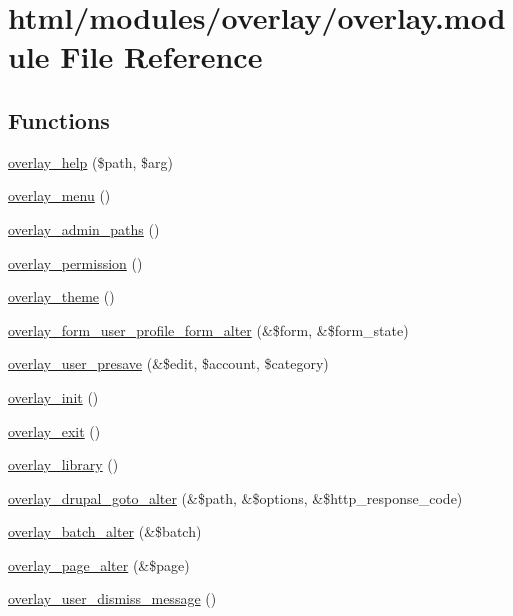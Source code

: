\hypertarget{overlay_8module}{
\section{html/modules/overlay/overlay.module File Reference}
\label{overlay_8module}
}
\subsection*{Functions}
\begin{DoxyCompactItemize}
\item 
\hyperlink{overlay_8module_a18127ec6257d994beff56b2fd30096f6}{overlay\_\-help} (\$path, \$arg)
\item 
\hyperlink{overlay_8module_aa3d9f958c957e818d7cbe42da37cbaf3}{overlay\_\-menu} ()
\item 
\hyperlink{overlay_8module_a1ccea18af9d51ab0f5549bbb95f3976c}{overlay\_\-admin\_\-paths} ()
\item 
\hyperlink{overlay_8module_a85176c474764d79629d986607de8d66e}{overlay\_\-permission} ()
\item 
\hyperlink{overlay_8module_affc885d56daf12cc33756c9ddeb5ff38}{overlay\_\-theme} ()
\item 
\hyperlink{overlay_8module_a42fa72cb204d2afbf03fe801842ea3ef}{overlay\_\-form\_\-user\_\-profile\_\-form\_\-alter} (\&\$form, \&\$form\_\-state)
\item 
\hyperlink{overlay_8module_adb8ac54c44a2606a1153ab15860fc343}{overlay\_\-user\_\-presave} (\&\$edit, \$account, \$category)
\item 
\hyperlink{overlay_8module_aa31ec5e73a1837996e5e33e8b814f1fd}{overlay\_\-init} ()
\item 
\hyperlink{overlay_8module_a6fb08436be20a7885c50eaa84a413f6c}{overlay\_\-exit} ()
\item 
\hyperlink{overlay_8module_ae047a291d9805cafb44b116162460984}{overlay\_\-library} ()
\item 
\hyperlink{overlay_8module_ad0368c6b16fb040fd8139e60e7b3b321}{overlay\_\-drupal\_\-goto\_\-alter} (\&\$path, \&\$options, \&\$http\_\-response\_\-code)
\item 
\hyperlink{overlay_8module_affb9e486f372808ca4d86fafc675ecb4}{overlay\_\-batch\_\-alter} (\&\$batch)
\item 
\hyperlink{overlay_8module_a6562f3cdc2016db35295e1c97a2de3f2}{overlay\_\-page\_\-alter} (\&\$page)
\item 
\hyperlink{overlay_8module_a82316c3dbea636c39a2cc05c630a0fa4}{overlay\_\-user\_\-dismiss\_\-message} ()

\end{DoxyCompactItemize}
